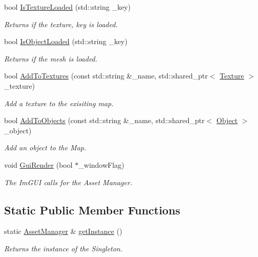 \begin{DoxyCompactItemize}
bool \mbox{\hyperlink{classpiolot_1_1_asset_manager_acc9c8e5aff5c4b93faa151e0efb012f3}{Is\+Texture\+Loaded}} (std\+::string \+\_\+key)
\begin{DoxyCompactList}\small\item\em Returns if the texture, key is loaded. \end{DoxyCompactList}\item 
bool \mbox{\hyperlink{classpiolot_1_1_asset_manager_a120535d011b245328a45a1d85f181cc0}{Is\+Object\+Loaded}} (std\+::string \+\_\+key)
\begin{DoxyCompactList}\small\item\em Returns if the mesh is loaded. \end{DoxyCompactList}\item 
bool \mbox{\hyperlink{classpiolot_1_1_asset_manager_a06b647312e18c2ca212d34211d262783}{Add\+To\+Textures}} (const std\+::string \&\+\_\+name, std\+::shared\+\_\+ptr$<$ \mbox{\hyperlink{classpiolot_1_1_texture}{Texture}} $>$ \+\_\+texture)
\begin{DoxyCompactList}\small\item\em Add a texture to the exisiting map. \end{DoxyCompactList}\item 
bool \mbox{\hyperlink{classpiolot_1_1_asset_manager_abfad75fa1cde6d1ecd77fbdf297a80b0}{Add\+To\+Objects}} (const std\+::string \&\+\_\+name, std\+::shared\+\_\+ptr$<$ \mbox{\hyperlink{classpiolot_1_1_object}{Object}} $>$ \+\_\+object)
\begin{DoxyCompactList}\small\item\em Add an object to the Map. \end{DoxyCompactList}\item 
void \mbox{\hyperlink{classpiolot_1_1_asset_manager_a00d1b6635e14cfdf2a618fff3ad61416}{Gui\+Render}} (bool $\ast$\+\_\+window\+Flag)
\begin{DoxyCompactList}\small\item\em The Im\+G\+UI calls for the Asset Manager. \end{DoxyCompactList}\end{DoxyCompactItemize}
\subsection*{Static Public Member Functions}
\begin{DoxyCompactItemize}
\item 
static \mbox{\hyperlink{classpiolot_1_1_asset_manager}{Asset\+Manager}} \& \mbox{\hyperlink{classpiolot_1_1_asset_manager_a5bcfd6d2719bcada7f5865eb6e39664b}{get\+Instance}} ()
\begin{DoxyCompactList}\small\item\em Returns the instance of the Singleton. \end{DoxyCompactList}\end{DoxyCompactItemize}

